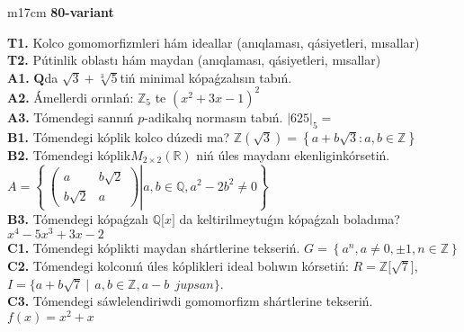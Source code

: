 \documentclass{article}
\begin{document}
\begin{tabular}{m{17cm}}
\textbf{80-variant}
\newline

\textbf{T1.} Kolco gomomorfizmleri hám ideallar (anıqlaması, qásiyetleri, mısallar) \\
\textbf{T2.} Pútinlik oblastı hám maydan (anıqlaması, qásiyetleri, mısallar) \\
\textbf{A1.} \(\mathbf{Q}\)da \(\sqrt{3} + \sqrt[3]{5}\)tiń minimal kópaǵzalısın tabıń. \\
\textbf{A2.} Ámellerdi orınlań: \(\mathbb{Z}_{5}\) te \(\left( x^{2} + 3x - 1 \right)^{2}\) \\
\textbf{A3.} Tómendegi sannıń \(p\)-adikalıq normasın tabıń. \(|625|_{5} =\) \\
\textbf{B1.} Tómendegi kóplik kolco dúzedi ma? \(\mathbb{Z}\left( \sqrt{3} \right) = \left\{ a + b\sqrt{3}:a,b \in \mathbb{Z} \right\}\) \\
\textbf{B2.} Tómendegi kóplik\(M_{2 \times 2}\left( \mathbb{R} \right)\) niń úles maydanı ekenliginkórsetiń. \(A = \left\{ \left. \ \begin{pmatrix}
a & b\sqrt{2} \\
b\sqrt{2} & a
\end{pmatrix} \right|a,b\mathbb{\in Q},a^{2} - 2b^{2} \neq 0 \right\}\) \\
\textbf{B3.} Tómendegi kópaǵzalı \(\mathbb{Q\lbrack}x\rbrack\) da keltirilmeytuǵın kópaǵzalı boladıma? \(x^{4} - 5x^{3} + 3x - 2\) \\
\textbf{C1.} Tómendegi kóplikti maydan shártlerine tekseriń. \(G = \left\{ a^{n},a \neq 0, \pm 1,n \in \mathbb{Z} \right\}\) \\
\textbf{C2.} Tómendegi kolconıń úles kóplikleri ideal bolıwın kórsetiń:
\(R\mathbb{= Z\lbrack}\sqrt{7}\rbrack\), \(I = \{ a + b\sqrt{7}\ |\ \ a,b \in \mathbb{Z,}a - b\ \ jupsan\}\). \\
\textbf{C3.} Tómendegi sáwlelendiriwdi gomomorfizm shártlerine tekseriń. \(f(x) = x^{2} + x\) \\

\end{tabular}
\vspace{1cm}
\end{document}
